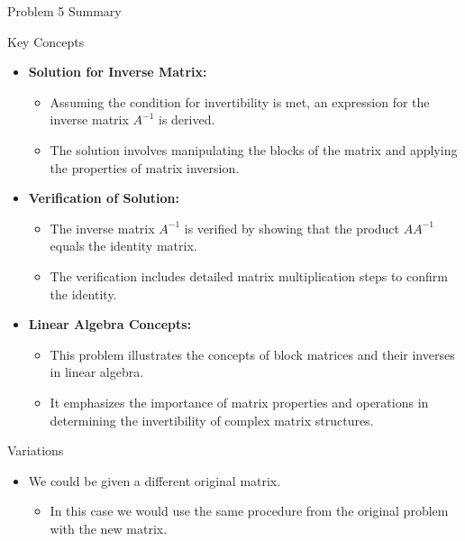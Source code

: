 \begin{summary}{Problem 5 Summary}
\begin{statement}{Key Concepts}
\begin{itemize}
\begin{itemize}
            \end{itemize}
            \item \textbf{Solution for Inverse Matrix:}
            \begin{itemize}
                \item Assuming the condition for invertibility is met, an expression for the inverse matrix $A^{-1}$ is derived.
                \item The solution involves manipulating the blocks of the matrix and applying the properties of matrix inversion.
            \end{itemize}
            \item \textbf{Verification of Solution:}
            \begin{itemize}
                \item The inverse matrix $A^{-1}$ is verified by showing that the product $AA^{-1}$ equals the identity matrix.
                \item The verification includes detailed matrix multiplication steps to confirm the identity.
            \end{itemize}
            \item \textbf{Linear Algebra Concepts:}
            \begin{itemize}
                \item This problem illustrates the concepts of block matrices and their inverses in linear algebra.
                \item It emphasizes the importance of matrix properties and operations in determining the invertibility of complex matrix structures.
            \end{itemize}
        \end{itemize}
    \end{statement}
    \begin{statement}{Variations}
        \begin{itemize}
            \item We could be given a different original matrix.
            \begin{itemize}
                \item In this case we would use the same procedure from the original problem with the new matrix.
            \end{itemize}
        \end{itemize}
    \end{statement}
\end{summary}

